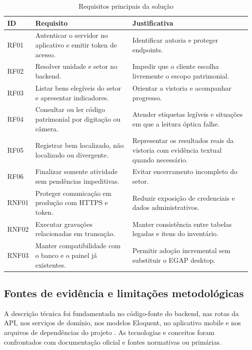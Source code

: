 \documentclass[12pt,a4paper]{article}
\begin{document}
\begin{table}[H]
\centering
\caption{Requisitos principais da solução}
\label{tab:requisitos}
\small
\begin{tabularx}{\textwidth}{L{1.3cm} Y Y}
\toprule
\textbf{ID} & \textbf{Requisito} & \textbf{Justificativa} \\
\midrule
RF01 & Autenticar o servidor no aplicativo e emitir token de acesso. &
Identificar autoria e proteger endpoints. \\
RF02 & Resolver unidade e setor no backend. &
Impedir que o cliente escolha livremente o escopo patrimonial. \\
RF03 & Listar bens elegíveis do setor e apresentar indicadores. &
Orientar a vistoria e acompanhar progresso. \\
RF04 & Consultar ou ler código patrimonial por digitação ou câmera. &
Atender etiquetas legíveis e situações em que a leitura óptica falhe. \\
RF05 & Registrar bem localizado, não localizado ou divergente. &
Representar os resultados reais da vistoria com evidência textual quando
necessário. \\
RF06 & Finalizar somente atividade sem pendências impeditivas. &
Evitar encerramento incompleto do setor. \\
RNF01 & Proteger comunicação em produção com HTTPS e token. &
Reduzir exposição de credenciais e dados administrativos. \\
RNF02 & Executar gravações relacionadas em transação. &
Manter consistência entre tabelas legadas e itens do inventário. \\
RNF03 & Manter compatibilidade com o banco e o painel já existentes. &
Permitir adoção incremental sem substituir o EGAP desktop. \\
\bottomrule
\end{tabularx}
\end{table}

\subsection{Fontes de evidência e limitações metodológicas}

A descrição técnica foi fundamentada no código-fonte do backend, nas rotas da
API, nos serviços de domínio, nos modelos Eloquent, no aplicativo mobile e nos
arquivos de dependências do projeto \cite{egapRepositorio}. As tecnologias e
conceitos foram confrontados com documentação oficial e fontes normativas ou
primárias.
\end{document}
